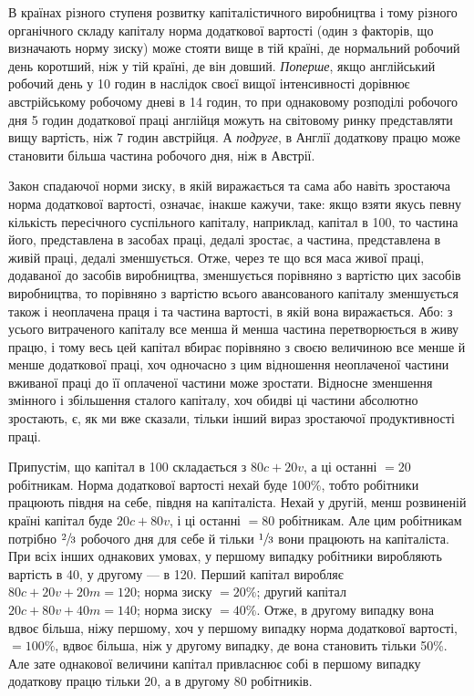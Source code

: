 \documentclass[12pt, a4paper, final]{memoir}
\begin{document}
В країнах різного ступеня розвитку капіталістичного виробництва і тому різного органічного складу капіталу норма додаткової вартості (один з факторів, що визначають норму зиску) може стояти вище в тій країні, де нормальний робочий день коротший, ніж у тій країні, де він довший. \emph{Поперше}, якщо англійський робочий день у 10 годин в наслідок своєї вищої інтенсивності дорівнює австрійському робочому дневі в 14 годин, то при однаковому розподілі робочого дня 5 годин додаткової праці англійця можуть на світовому ринку представляти вищу вартість, ніж 7 годин австрійця. А \emph{подруге}, в Англії додаткову працю може становити більша частина робочого дня, ніж в Австрії.

Закон спадаючої норми зиску, в якій виражається та сама або навіть зростаюча норма додаткової вартості, означає, інакше кажучи, таке: якщо взяти якусь певну кількість пересічного суспільного капіталу, наприклад, капітал в 100, то частина його, представлена в засобах праці, дедалі зростає, а частина, представлена в живій праці, дедалі зменшується. Отже, через те що вся маса живої праці, додаваної до засобів виробництва, зменшується порівняно з вартістю цих засобів виробництва, то порівняно з вартістю всього авансованого капіталу зменшується також і неоплачена праця і та частина вартості, в якій вона виражається. Або: з усього витраченого капіталу все менша й менша частина перетворюється в живу працю, і тому весь цей капітал вбирає порівняно з своєю величиною все менше й менше додаткової праці, хоч одночасно з цим відношення неоплаченої частини вживаної праці до її оплаченої частини може зростати. Відносне зменшення змінного і збільшення сталого капіталу, хоч обидві ці частини абсолютно зростають, є, як ми вже сказали, тільки інший вираз зростаючої продуктивності праці.

Припустім, що капітал в 100 складається з $80c + 20v$, а ці останні $=20$ робітникам. Норма додаткової вартості нехай буде 100\%, тобто робітники працюють півдня на себе, півдня на капіталіста. Нехай у другій, менш розвиненій країні капітал буде $20c+80v$, і ці останні $=80$ робітникам. Але цим робітникам потрібно $\sfrac{2}{3}$ робочого дня для себе й тільки $\sfrac{1}{3}$ вони працюють на капіталіста. При всіх інших однакових умовах, у першому випадку робітники виробляють вартість в 40, у другому — в 120. Перший капітал виробляє $80c + 20v + 20m=120$; норма зиску $=20\%$; другий капітал $20c + 80v + 40m=140$; норма зиску $=40\%$. Отже, в другому випадку вона вдвоє більша, ніжу першому, хоч у першому випадку норма додаткової вартості, $=100\%$, вдвоє більша, ніж у другому випадку, де вона становить тільки 50\%. Але зате однакової величини капітал привласнює собі в першому випадку додаткову працю тільки 20, а в другому 80 робітників.
\end{document}
